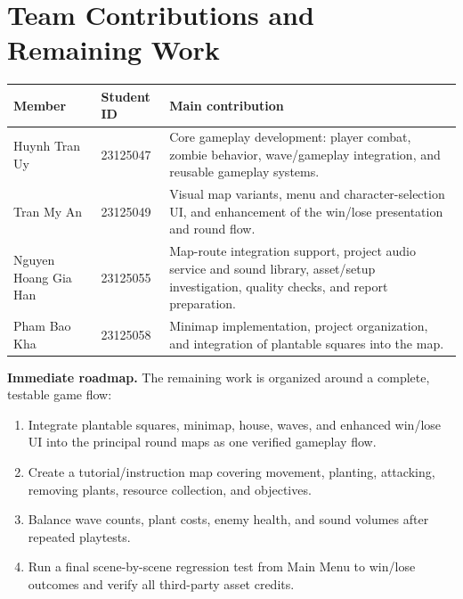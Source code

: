 \clearpage
\section{Team Contributions and Remaining Work}

\begin{longtable}{p{}p{}p{}}
\toprule
Member & Student ID & Main contribution\\
\midrule
Huynh Tran Uy & 23125047 & Core gameplay development: player combat, zombie behavior, wave/gameplay integration, and reusable gameplay systems.\\
Tran My An & 23125049 & Visual map variants, menu and character-selection UI, and enhancement of the win/lose presentation and round flow.\\
Nguyen Hoang Gia Han & 23125055 & Map-route integration support, project audio service and sound library, asset/setup investigation, quality checks, and report preparation.\\
Pham Bao Kha & 23125058 & Minimap implementation, project organization, and integration of plantable squares into the map.\\
\bottomrule
\end{longtable}

\textbf{Immediate roadmap.} The remaining work is organized around a complete, testable game flow:
\begin{enumerate}
  \item Integrate plantable squares, minimap, house, waves, and enhanced win/lose UI into the principal round maps as one verified gameplay flow.
  \item Create a tutorial/instruction map covering movement, planting, attacking, removing plants, resource collection, and objectives.
  \item Balance wave counts, plant costs, enemy health, and sound volumes after repeated playtests.
  \item Run a final scene-by-scene regression test from Main Menu to win/lose outcomes and verify all third-party asset credits.
\end{enumerate}

